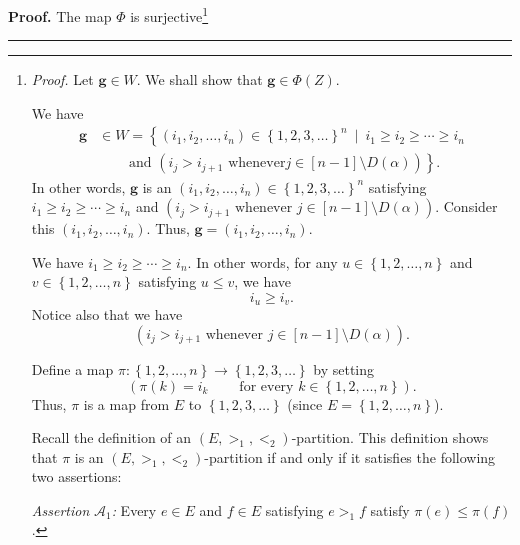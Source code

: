 \documentclass[numbers=enddot,12pt,final,onecolumn,notitlepage,abstracton]{scrartcl}
\theoremstyle{definition}
\newenvironment{proof}[1][Proof]{\noindent\textbf{#1.} }{\ \rule{0.5em}{0.5em}}
\newenvironment{verlong}{}{}
\begin{document}
\begin{verlong}
\begin{footnotesize}
\begin{proof}
The map $\Phi$ is surjective\footnote{\textit{Proof.} Let $\mathbf{g}\in W$.
We shall show that $\mathbf{g}\in\Phi\left(  Z\right)  $.
\par
We have%
\begin{align*}
\mathbf{g} &  \in W=\left\{  \left(  i_{1},i_{2},\ldots,i_{n}\right)
\in\left\{  1,2,3,\ldots\right\}  ^{n}\ \mid\ i_{1}\geq i_{2}\geq\cdots\geq
i_{n}\right.  \\
&  \ \ \ \ \ \ \ \ \ \ \left.  \text{and }\left(  i_{j}>i_{j+1}\text{ whenever
}j\in\left[  n-1\right]  \setminus D\left(  \alpha\right)  \right)  \right\}
.
\end{align*}
In other words, $\mathbf{g}$ is an $\left(  i_{1},i_{2},\ldots,i_{n}\right)
\in\left\{  1,2,3,\ldots\right\}  ^{n}$ satisfying $i_{1}\geq i_{2}\geq
\cdots\geq i_{n}$ and $\left(  i_{j}>i_{j+1}\text{ whenever }j\in\left[
n-1\right]  \setminus D\left(  \alpha\right)  \right)  $. Consider this
$\left(  i_{1},i_{2},\ldots,i_{n}\right)  $. Thus, $\mathbf{g}=\left(
i_{1},i_{2},\ldots,i_{n}\right)  $.
\par
We have $i_{1}\geq i_{2}\geq\cdots\geq i_{n}$. In other words, for any
$u\in\left\{  1,2,\ldots,n\right\}  $ and $v\in\left\{  1,2,\ldots,n\right\}
$ satisfying $u\leq v$, we have%
\begin{equation}
i_{u}\geq i_{v}.\label{pf.prop.example.Gamma.Sc3.surj.1}%
\end{equation}
Notice also that we have%
\begin{equation}
\left(  i_{j}>i_{j+1}\text{ whenever }j\in\left[  n-1\right]  \setminus
D\left(  \alpha\right)  \right)  .\label{pf.prop.example.Gamma.Sc3.surj.2}%
\end{equation}
\par
Define a map $\pi:\left\{  1,2,\ldots,n\right\}  \rightarrow\left\{
1,2,3,\ldots\right\}  $ by setting%
\[
\left(  \pi\left(  k\right)  =i_{k}\ \ \ \ \ \ \ \ \ \ \text{for every }%
k\in\left\{  1,2,\ldots,n\right\}  \right)  .
\]
Thus, $\pi$ is a map from $E$ to $\left\{  1,2,3,\ldots\right\}  $ (since
$E=\left\{  1,2,\ldots,n\right\}  $).
\par
Recall the definition of an $\left(  E,>_{1},<_{2}\right)  $-partition. This
definition shows that $\pi$ is an $\left(  E,>_{1},<_{2}\right)  $-partition
if and only if it satisfies the following two assertions:
\par
\textit{Assertion }$\mathcal{A}_{1}$\textit{:} Every $e\in E$ and $f\in E$
satisfying $e>_{1}f$ satisfy $\pi\left(  e\right)  \leq\pi\left(  f\right)  $.
\par
}
\end{proof}
\end{footnotesize}
\end{verlong}
\end{document}
